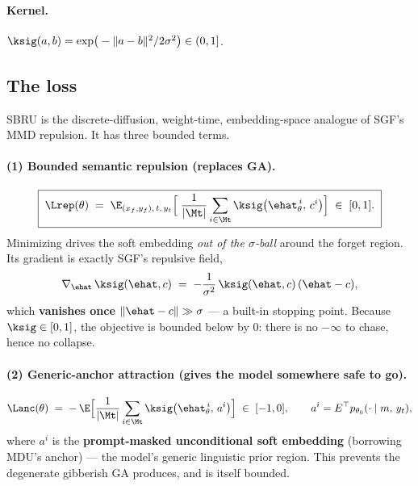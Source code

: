 \paragraph{Kernel.} $\ksig(a,b) = \exp\!\big(-\|a - b\|^2 / 2\sigma^2\big) \in (0, 1]$.

\subsection{The loss}

SBRU is the discrete-diffusion, weight-time, embedding-space analogue of SGF's MMD repulsion. It has
three bounded terms.

\paragraph{(1) Bounded semantic repulsion (replaces GA).}
\begin{equation}
\boxed{\;
\Lrep(\theta) \;=\; \E_{(x_f,y_f),\,t,\,y_t}
\Big[\; \frac{1}{|\Mt|} \sum_{i \in \Mt} \ksig\big(\ehat_\theta^{\,i},\, c^{i}\big) \Big]
\;\in\; [0,1]. \;}
\label{eq:lrep}
\end{equation}
Minimizing drives the soft embedding \emph{out of the $\sigma$-ball} around the forget region. Its
gradient is exactly SGF's repulsive field,
\begin{equation}
\nabla_{\ehat}\, \ksig(\ehat, c) \;=\; -\frac{1}{\sigma^2}\, \ksig(\ehat, c)\,(\ehat - c),
\label{eq:lrep-grad}
\end{equation}
which \textbf{vanishes once} $\|\ehat - c\| \gg \sigma$ --- a built-in stopping point. Because
$\ksig \in [0,1]$, the objective is bounded below by $0$: there is no $-\infty$ to chase, hence no
collapse.

\paragraph{(2) Generic-anchor attraction (gives the model somewhere safe to go).}
\begin{equation}
\Lanc(\theta) \;=\; -\,\E\Big[\frac{1}{|\Mt|}\sum_{i\in\Mt} \ksig\big(\ehat_\theta^{\,i},\, a^{i}\big)\Big]
\;\in\; [-1, 0],
\qquad
a^{i} = E^\top p_{\theta_0}(\cdot \mid m,\, y_t),
\label{eq:lanc}
\end{equation}
where $a^i$ is the \textbf{prompt-masked unconditional soft embedding} (borrowing MDU's anchor) --- the
model's generic linguistic prior region. This prevents the degenerate gibberish GA produces, and is
itself bounded.

